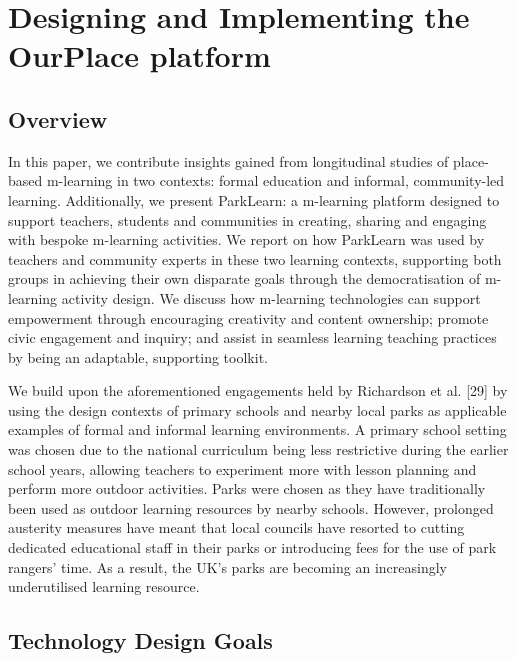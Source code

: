 \chapter{Designing and Implementing the OurPlace platform}

\section{Overview}
In this paper, we contribute insights gained from longitudinal studies of place-based m-learning in two contexts: formal education and informal, community-led learning. Additionally, we present ParkLearn: a m-learning platform designed to support teachers, students and communities in creating, sharing and engaging with bespoke m-learning activities. We report on how ParkLearn was used by teachers and community experts in these two learning contexts, supporting both groups in achieving their own disparate goals through the democratisation of m-learning activity design. We discuss how m-learning technologies can support empowerment through encouraging creativity and content ownership; promote civic engagement and inquiry; and assist in seamless learning teaching practices by being an adaptable, supporting toolkit.

We build upon the aforementioned engagements held by Richardson et al. [29] by using the design contexts of primary schools and nearby local parks as applicable examples of formal and informal learning environments. A primary school setting was chosen due to the national curriculum being less restrictive during the earlier school years, allowing teachers to experiment more with lesson planning and perform more outdoor activities. Parks were chosen as they have traditionally been used as outdoor learning resources by nearby schools. However, prolonged austerity measures have meant that local councils have resorted to cutting dedicated educational staff in their parks or introducing fees for the use of park rangers’ time. As a result, the UK’s parks are becoming an increasingly underutilised learning resource.

\section{Technology Design Goals}

